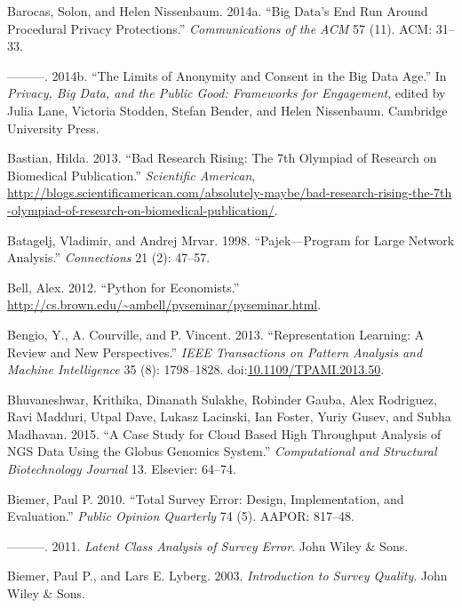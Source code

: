 \documentclass[]{krantz}
\begin{document}
\hypertarget{ref-barocas2014big}{}
Barocas, Solon, and Helen Nissenbaum. 2014a. ``Big Data's End Run Around
Procedural Privacy Protections.'' \emph{Communications of the ACM} 57
(11). ACM: 31--33.

\hypertarget{ref-barocas2014bigger}{}
---------. 2014b. ``The Limits of Anonymity and Consent in the Big Data
Age.'' In \emph{Privacy, Big Data, and the Public Good: Frameworks for
Engagement}, edited by Julia Lane, Victoria Stodden, Stefan Bender, and
Helen Nissenbaum. Cambridge University Press.

\hypertarget{ref-Bastian2013}{}
Bastian, Hilda. 2013. ``Bad Research Rising: The 7th Olympiad of
Research on Biomedical Publication.'' \emph{Scientific American},
\url{http://blogs.scientificamerican.com/absolutely-maybe/bad-research-rising-the-7th}
\url{-olympiad-of-research-on-biomedical-publication/}.

\hypertarget{ref-batagelj1998pajek}{}
Batagelj, Vladimir, and Andrej Mrvar. 1998. ``Pajek---Program for Large
Network Analysis.'' \emph{Connections} 21 (2): 47--57.

\hypertarget{ref-BellPython}{}
Bell, Alex. 2012. ``Python for Economists.''
\url{http://cs.brown.edu/~ambell/pyseminar/pyseminar.html}.

\hypertarget{ref-bengio-13}{}
Bengio, Y., A. Courville, and P. Vincent. 2013. ``Representation
Learning: A Review and New Perspectives.'' \emph{IEEE Transactions on
Pattern Analysis and Machine Intelligence} 35 (8): 1798--1828.
doi:\href{https://doi.org/10.1109/TPAMI.2013.50}{10.1109/TPAMI.2013.50}.

\hypertarget{ref-bhuvaneshwar2015case}{}
Bhuvaneshwar, Krithika, Dinanath Sulakhe, Robinder Gauba, Alex
Rodriguez, Ravi Madduri, Utpal Dave, Lukasz Lacinski, Ian Foster, Yuriy
Gusev, and Subha Madhavan. 2015. ``A Case Study for Cloud Based High
Throughput Analysis of NGS Data Using the Globus Genomics System.''
\emph{Computational and Structural Biotechnology Journal} 13. Elsevier:
64--74.

\hypertarget{ref-biemer2010total}{}
Biemer, Paul P. 2010. ``Total Survey Error: Design, Implementation, and
Evaluation.'' \emph{Public Opinion Quarterly} 74 (5). AAPOR: 817--48.

\hypertarget{ref-biemer2011latent}{}
---------. 2011. \emph{Latent Class Analysis of Survey Error}. John
Wiley \& Sons.

\hypertarget{ref-biemer2003}{}
Biemer, Paul P., and Lars E. Lyberg. 2003. \emph{Introduction to Survey
Quality}. John Wiley \& Sons.
\end{document}
